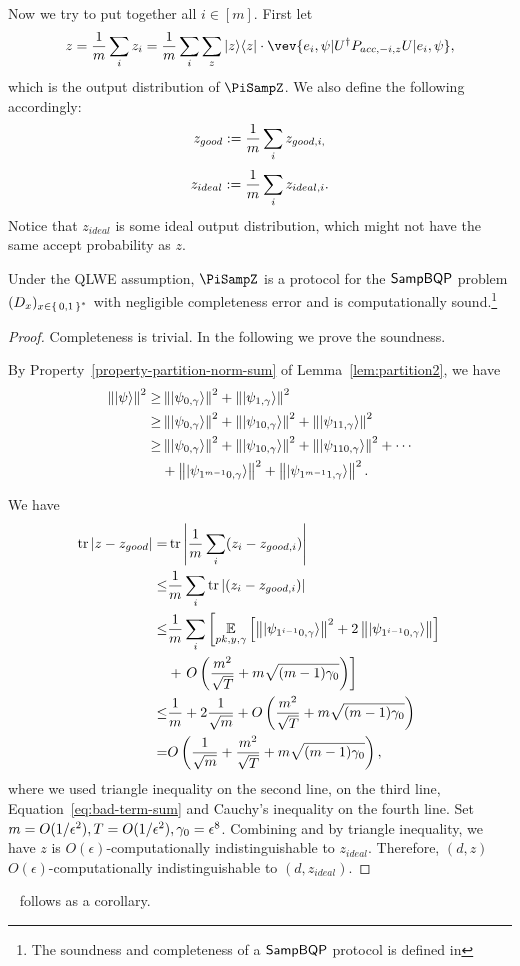 Now we try to put together all $i\in [m]$. First let
$$z=\frac{1}{m} \sum_i z_i= \frac{1}{m} \sum_i \sum_z \proj{z} \cdot \vev{e_i,\psi|U^\dag P_{acc,-i,z} U|e_i,\psi},$$
which is the output distribution of $\PiSampZ$.
We also define the following accordingly:
$$z_{good}:= \frac{1}{m}\sum_i z_{good,i,}$$
$$z_{ideal}:= \frac{1}{m}\sum_i z_{ideal,i}.$$
Notice that $z_{ideal}$ is some ideal output distribution, which might not have the same accept probability as $z$.

\begin{theorem}\label{thm:qpip0} 
	Under the QLWE assumption, $\PiSampZ$ is a protocol for the $\operatorname{\mathsf{SampBQP}}$ problem $(D_x)_{x\in\set{0,1}^*}$  with negligible completeness error and is computationally sound.\footnote{The soundness and completeness of a $\operatorname{\mathsf{SampBQP}}$ protocol is defined in }
	
\end{theorem}
\begin{proof}
	Completeness is trivial. In the following we prove the soundness.
	
	By Property~\ref{property-partition-norm-sum} of Lemma~\ref{lem:partition2}, we have
	\begin{align} \label{eq:bad-term-sum}
		\left\lVert\ket{\psi}\right\rVert^2 \geq& \left\lVert\ket{\psi_{0,\gamma}}\right\rVert^2+\left\lVert\ket{\psi_{1,\gamma}}\right\rVert^2 \nonumber \\
		\geq& \left\lVert\ket{\psi_{0,\gamma}}\right\rVert^2+
		\left\lVert\ket{\psi_{10,\gamma}}\right\rVert^2+ \left\lVert\ket{\psi_{11,\gamma}}\right\rVert^2 \nonumber \\
		\geq& \left\lVert\ket{\psi_{0,\gamma}}\right\rVert^2+
		\left\lVert\ket{\psi_{10,\gamma}}\right\rVert^2+ \left\lVert\ket{\psi_{110,\gamma}}\right\rVert^2 +\cdots  \nonumber \\
		&+ \left\lVert\ket{\psi_{1^{m-1}0,\gamma}}\right\rVert^2+ \left\lVert\ket{\psi_{1^{m-1}1,\gamma}}\right\rVert^2.
	\end{align}

	We have
	\begin{align} \label{eq:z-z-good}
		\tr|z-z_{good}| =& \tr\L|\frac{1}{m}\sum_i (z_i-z_{good,i})\R| \nn \\
		\leq&  \frac{1}{m}\sum_i\tr| (z_i-z_{good,i})| \nn \\
		\leq&  \frac{1}{m}\sum_i\L[\E_{pk, y, \gamma}\L[\norm{\ket{\psi_{1^{i-1}0,\gamma}}}^2+ 2\norm{\ket{\psi_{1^{i-1}0,\gamma}}}\R] \R.\nn \\
		&+ \L. O\L(\frac{m^2}{\sqrt T}+m\sqrt{(m-1)\gamma_0}\R)\R] \nn \\%
		\leq&  \frac{1}{m}+ 2\frac{1}{\sqrt m}+O\L(\frac{m^2}{\sqrt T}+m\sqrt{(m-1)\gamma_0}\R) \nn \\ %
		=&O\L( \frac{1}{\sqrt m}+\frac{m^2}{\sqrt T}+m\sqrt{(m-1)\gamma_0}\R),  
	\end{align}
	where we used triangle inequality on the second line,  on the third line, Equation~\ref{eq:bad-term-sum} and Cauchy's inequality on the fourth line.
	Set $m=O(1/\epsilon^2), T=O(1/\epsilon^2),\gamma_0=\epsilon^8$. Combining  and  by triangle inequality, we have $z$ is $O(\epsilon)$-computationally indistinguishable to $z_{ideal}$. Therefore, $(d,z)$  $O(\epsilon)$-computationally indistinguishable to $(d,z_{ideal})$.
\end{proof}

~ follows as a corollary.
